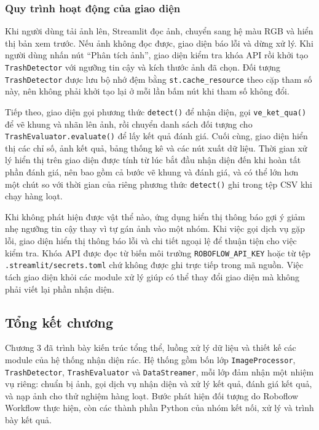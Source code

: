 \documentclass[a4paper,13pt]{extarticle}
\begin{document}
\subsubsection{Quy trình hoạt động của giao diện}
Khi người dùng tải ảnh lên, Streamlit đọc ảnh, chuyển sang hệ màu RGB và hiển thị bản xem trước. Nếu ảnh không đọc được, giao diện báo lỗi và dừng xử lý. Khi người dùng nhấn nút ``Phân tích ảnh'', giao diện kiểm tra khóa API rồi khởi tạo \texttt{TrashDetector} với ngưỡng tin cậy và kích thước ảnh đã chọn. Đối tượng \texttt{TrashDetector} được lưu bộ nhớ đệm bằng \texttt{st.cache\_resource} theo cặp tham số này, nên không phải khởi tạo lại ở mỗi lần bấm nút khi tham số không đổi.

Tiếp theo, giao diện gọi phương thức \texttt{detect()} để nhận diện, gọi \texttt{ve\_ket\_qua()} để vẽ khung và nhãn lên ảnh, rồi chuyển danh sách đối tượng cho \texttt{TrashEvaluator.evaluate()} để lấy kết quả đánh giá. Cuối cùng, giao diện hiển thị các chỉ số, ảnh kết quả, bảng thống kê và các nút xuất dữ liệu. Thời gian xử lý hiển thị trên giao diện được tính từ lúc bắt đầu nhận diện đến khi hoàn tất phần đánh giá, nên bao gồm cả bước vẽ khung và đánh giá, và có thể lớn hơn một chút so với thời gian của riêng phương thức \texttt{detect()} ghi trong tệp CSV khi chạy hàng loạt.

Khi không phát hiện được vật thể nào, ứng dụng hiển thị thông báo gợi ý giảm nhẹ ngưỡng tin cậy thay vì tự gán ảnh vào một nhóm. Khi việc gọi dịch vụ gặp lỗi, giao diện hiển thị thông báo lỗi và chi tiết ngoại lệ để thuận tiện cho việc kiểm tra. Khóa API được đọc từ biến môi trường \texttt{ROBOFLOW\_API\_KEY} hoặc từ tệp \texttt{.streamlit/secrets.toml} chứ không được ghi trực tiếp trong mã nguồn. Việc tách giao diện khỏi các module xử lý giúp có thể thay đổi giao diện mà không phải viết lại phần nhận diện.

\subsection{Tổng kết chương}
Chương 3 đã trình bày kiến trúc tổng thể, luồng xử lý dữ liệu và thiết kế các module của hệ thống nhận diện rác. Hệ thống gồm bốn lớp \texttt{ImageProcessor}, \texttt{TrashDetector}, \texttt{TrashEvaluator} và \texttt{DataStreamer}, mỗi lớp đảm nhận một nhiệm vụ riêng: chuẩn bị ảnh, gọi dịch vụ nhận diện và xử lý kết quả, đánh giá kết quả, và nạp ảnh cho thử nghiệm hàng loạt. Bước phát hiện đối tượng do Roboflow Workflow thực hiện, còn các thành phần Python của nhóm kết nối, xử lý và trình bày kết quả.
\end{document}

